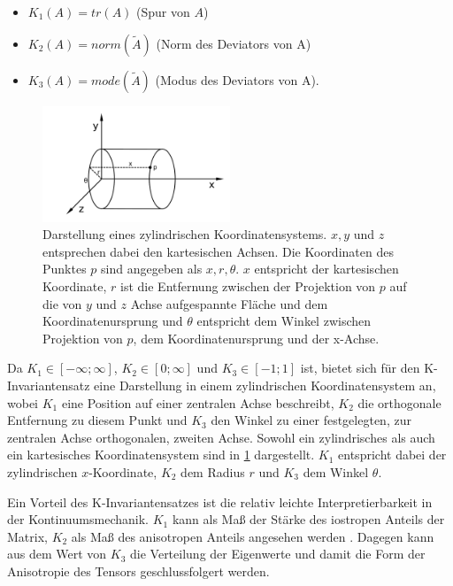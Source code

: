 \documentclass[a4paper,fontsize=12pt,toc=bib,parskip=half,ngerman]{scrartcl}
\begin{document}
\begin{itemize}
	\item $K_1(A)=tr(A)$ (Spur von $A$)
	\item $K_2(A)=norm(\tilde{A})$ (Norm des Deviators von A)
	\item $K_3(A)=mode(\tilde{A})$ (Modus des Deviators von A).
\end{itemize}


\begin{figure}
	\centering
	\includegraphics[width=0.5\textwidth]{pictures/cylinder}
	\caption{Darstellung eines zylindrischen Koordinatensystems. $x,y$ und $z$ entsprechen dabei den kartesischen Achsen. Die Koordinaten des Punktes $p$ sind angegeben als $x, r, \theta$. $x$ entspricht der kartesischen Koordinate, $r$ ist die Entfernung zwischen der Projektion von $p$ auf die von $y$ und $z$ Achse aufgespannte Fl\"ache und dem Koordinatenursprung und $\theta$ entspricht dem Winkel zwischen Projektion von $p$, dem Koordinatenursprung und der x-Achse. }
	\label{cylinderCoords}
\end{figure}

Da $K_1 \in [-\infty; \infty]$, $K_2 \in [0;\infty]$ und $K_3 \in [-1;1]$ ist, bietet sich f\"ur den K-Invariantensatz eine Darstellung in einem zylindrischen Koordinatensystem an, wobei $K_1$ eine Position auf einer zentralen Achse beschreibt, $K_2$ die orthogonale Entfernung zu diesem Punkt und $K_3$ den Winkel zu einer festgelegten, zur zentralen Achse orthogonalen, zweiten Achse. Sowohl ein zylindrisches als auch ein kartesisches Koordinatensystem sind in \cref{cylinderCoords} dargestellt. $K_1$ entspricht dabei der zylindrischen $x$-Koordinate, $K_2$ dem Radius $r$ und $K_3$ dem Winkel $\theta$.

Ein Vorteil des K-Invariantensatzes ist die relativ leichte Interpretierbarkeit in der Kontinuumsmechanik. $K_1$ kann als Ma{\ss} der St\"arke des iostropen Anteils der Matrix, $K_2$ als Ma{\ss} des anisotropen Anteils angesehen werden \cite{kindlmann2007diffusion}. Dagegen kann aus dem Wert von $K_3$ die Verteilung der Eigenwerte und damit die Form der Anisotropie des Tensors geschlussfolgert werden.
\end{document}

